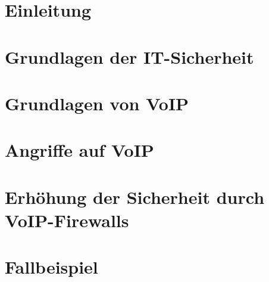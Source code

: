\documentclass [a4paper,11pt,oneside,german,webreferences,todo]{INSOthesis}
\begin{document}
\maketitle

%

\chapter{Einleitung}
\label{ch:ch1}


\chapter{Grundlagen der IT-Sicherheit}
\label{ch:ch2}


\chapter{Grundlagen von VoIP}
\label{ch:ch3}


\chapter{Angriffe auf VoIP}
\label{ch:ch4}


\chapter{Erhöhung der Sicherheit durch VoIP-Firewalls}
\label{ch:ch5}


\chapter{Fallbeispiel}
\label{ch:ch6}

\end{document}
